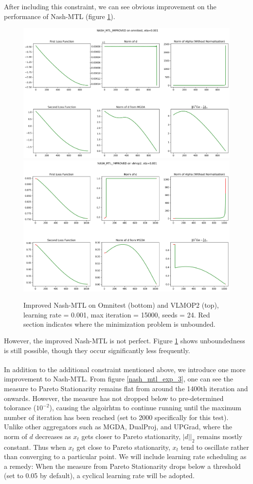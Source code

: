 \documentclass{article}
\renewcommand{\|}{\biggr|}
\begin{document}
    After including this constraint, we can see obvious improvement on the performance of Nash-MTL (figure \ref{nash_mtl_exp_2}). 
        \begin{figure}
        \includegraphics[scale = 0.4]{src/example3.png}
        \includegraphics[scale = 0.4]{src/example4.png}
        \caption{Improved Nash-MTL on Omnitest (bottom) and VLMOP2 (top), learning rate = 0.001, max iteration = 15000, seeds = 24. Red section indicates where the minimization problem is unbounded.}\label{nash_mtl_exp_2}
    \end{figure}   
    However, the improved Nash-MTL is not perfect. Figure \ref{nash_mtl_exp_2} shows unboundedness is still possible, though they occur significantly less frequently.\\
    ~\\
    In addition to the additional constraint mentioned above, we introduce one more improvement to Nash-MTL. From figure \ref{nash_mtl_exp_3}, one can see the measure to Pareto Stationarity remains flat from around the 1400th iteration and onwards. However, the measure has not dropped below to pre-determined tolorance ($10^{-2}$), causing the algoirhtm to continue running until the maximum number of iteration has been reached (set to 2000 specifically for this test). Unlike other aggregators such as MGDA, DualProj, and UPGrad, where the norm of $d$ decreases as $x_t$ gets closer to Pareto stationarity, $|d||_2$ remains mostly constant. Thus when $x_t$ get close to Pareto stationarity, $x_t$ tend to oscillate rather than converging to a particular point. We will include learning rate scheduling as a remedy: When the measure from Pareto Stationarity drops below a threshold (set to 0.05 by default), a cyclical learning rate will be adopted. 
\end{document}

